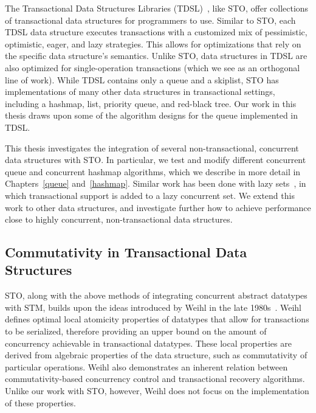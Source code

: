 The Transactional Data Structures Libraries (TDSL)~\cite{tdsl}, like STO, offer collections of transactional data structures for programmers to use. Similar to STO, each TDSL data structure executes transactions with a customized mix of pessimistic, optimistic, eager, and lazy strategies.
This allows for optimizations that rely on the specific data structure's semantics. Unlike STO, data structures in TDSL are also optimized for single-operation transactions (which we see as an orthogonal line of work). While TDSL contains only a queue and a skiplist, STO has implementations of many other data structures in transactional settings, including a hashmap, list, priority queue, and red-black tree. Our work in this thesis draws upon some of the algorithm designs for the queue implemented in TDSL.

This thesis investigates the integration of several non-transactional, concurrent data structures with STO. In particular, we test and modify different concurrent queue and concurrent hashmap algorithms, which we describe in more detail in Chapters~\ref{queue} and~\ref{hashmap}. Similar work has been done with lazy sets~\cite{lazyset}, in which transactional support is added to a lazy concurrent set. We extend this work to other data structures, and investigate further how to achieve performance close to highly concurrent, non-transactional data structures.

\subsection{Commutativity in Transactional Data Structures}

STO, along with the above methods of integrating concurrent abstract datatypes with STM, builds upon the ideas introduced by Weihl in the late 1980s~\cite{weihl}. Weihl defines optimal local atomicity properties of datatypes that allow for transactions to be serialized, therefore providing an upper bound on the amount of concurrency achievable in transactional datatypes. These local properties are derived from algebraic properties of the data structure, such as commutativity of particular operations. Weihl also demonstrates an inherent relation between commutativity-based concurrency control and transactional recovery algorithms. Unlike our work with STO, however, Weihl does not focus on the implementation of these properties.

